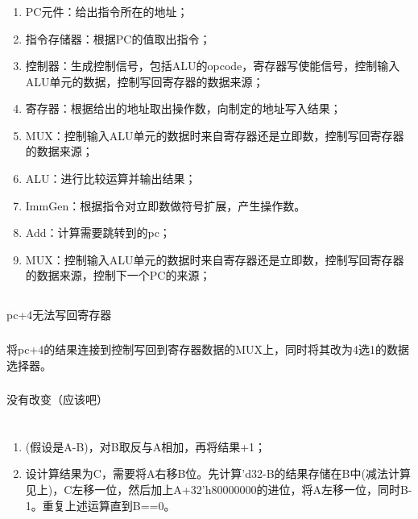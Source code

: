 \documentclass[12pt,a4paper]{ctexart}
\begin{document}
\subsubsection{}
\begin{enumerate}
    \item PC元件：给出指令所在的地址；
    \item 指令存储器：根据PC的值取出指令；
    \item 控制器：生成控制信号，包括ALU的opcode，寄存器写使能信号，控制输入ALU单元的数据，控制写回寄存器的数据来源；
    \item 寄存器：根据给出的地址取出操作数，向制定的地址写入结果；
    \item MUX：控制输入ALU单元的数据时来自寄存器还是立即数，控制写回寄存器的数据来源；
    \item ALU：进行比较运算并输出结果；
    \item ImmGen：根据指令对立即数做符号扩展，产生操作数。
    \item Add：计算需要跳转到的pc；
    \item MUX：控制输入ALU单元的数据时来自寄存器还是立即数，控制写回寄存器的数据来源，控制下一个PC的来源；
\end{enumerate}
\subsection{}
\subsubsection{}
pc+4无法写回寄存器
\subsubsection{}
将pc+4的结果连接到控制写回到寄存器数据的MUX上，同时将其改为4选1的数据选择器。
\subsubsection{}
没有改变（应该吧）
\section{}
\subsection{}
\begin{enumerate}
    \item (假设是A-B)，对B取反与A相加，再将结果+1；
    \item 设计算结果为C，需要将A右移B位。先计算'd32-B的结果存储在B中(减法计算见上)，C左移一位，然后加上A+32'h80000000的进位，将A左移一位，同时B-1。重复上述运算直到B==0。
\end{enumerate}
\end{document}
